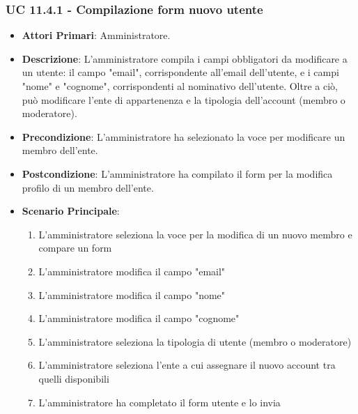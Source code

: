 			\subsubsection{UC 11.4.1 - Compilazione form nuovo utente}
			\begin{itemize}
				\item \textbf{Attori Primari}: Amministratore.
				\item \textbf{Descrizione}: L'amministratore compila i campi obbligatori da modificare a un utente: il campo "email", corrispondente all'email dell'utente, e i campi "nome" e "cognome", corrispondenti al nominativo dell'utente. Oltre a ciò, può modificare l'ente di appartenenza e la tipologia dell'account (membro o moderatore).
				\item \textbf{Precondizione}: L'amministratore ha selezionato la voce per modificare un membro dell'ente.
				\item \textbf{Postcondizione}: L'amministratore ha compilato il form per la modifica profilo di un membro dell'ente.
				\item \textbf{Scenario Principale}:
				\begin{enumerate}
					\item{L'amministratore seleziona la voce per la modifica di un nuovo membro e compare un form}
					\item{L'amministratore modifica il campo "email"}
					\item{L'amministratore modifica il campo "nome"}
					\item{L'amministratore modifica il campo "cognome"}
					\item{L'amministratore seleziona la tipologia di utente (membro o moderatore)}
					\item{L'amministratore seleziona l'ente a cui assegnare il nuovo account tra quelli disponibili}
					\item{L'amministratore ha completato il form utente e lo invia}
				\end{enumerate}	
			\end{itemize}


